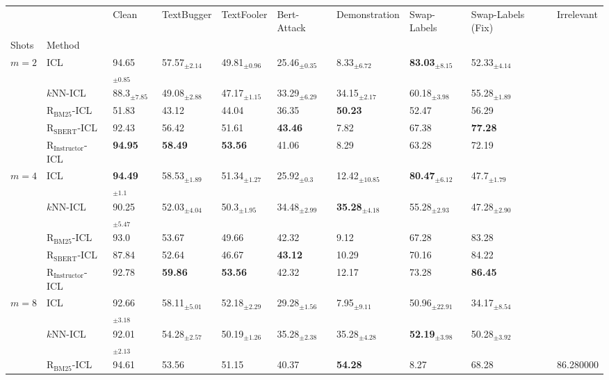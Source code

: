 \begin{tabular}{llllllllll}
\toprule
 &  & Clean & TextBugger & TextFooler & Bert-Attack & Demonstration & Swap-Labels & Swap-Labels (Fix) & Irrelevant  \\
Shots & Method &  &  &  &  &  &  &  &  \\
\midrule
\multirow[t]{5}{*}{$m=2$} & ICL & 94.65$_{\pm0.85}$ & 57.57$_{\pm2.14}$ & 49.81$_{\pm0.96}$ & 25.46$_{\pm0.35}$ & 8.33$_{\pm6.72}$ & \textbf{83.03$_{\pm8.15}$} & 52.33$_{\pm4.14}$ &  \\
 & $k$NN-ICL & 88.3$_{\pm7.85}$ & 49.08$_{\pm2.88}$ & 47.17$_{\pm1.15}$ & 33.29$_{\pm6.29}$ & 34.15$_{\pm2.17}$ & 60.18$_{\pm3.98}$ & 55.28$_{\pm1.89}$ &  \\
 & $\text{R}_{\text{BM25}}$-ICL & 51.83 & 43.12 & 44.04 & 36.35 & \textbf{50.23} & 52.47 & 56.29 &  \\
 & $\text{R}_{\text{SBERT}}$-ICL & 92.43 & 56.42 & 51.61 & \textbf{43.46} & 7.82 & 67.38 & \textbf{77.28} &  \\
 & $\text{R}_{\text{Instructor}}$-ICL & \textbf{94.95} & \textbf{58.49} & \textbf{53.56} & 41.06 & 8.29 & 63.28 & 72.19 &  \\
\cline{1-10}
\multirow[t]{5}{*}{$m=4$} & ICL & \textbf{94.49$_{\pm1.1}$} & 58.53$_{\pm1.89}$ & 51.34$_{\pm1.27}$ & 25.92$_{\pm0.3}$ & 12.42$_{\pm10.85}$ & \textbf{80.47$_{\pm6.12}$} & 47.7$_{\pm1.79}$ &  \\
 & $k$NN-ICL & 90.25$_{\pm5.47}$ & 52.03$_{\pm4.04}$ & 50.3$_{\pm1.95}$ & 34.48$_{\pm2.99}$ & \textbf{35.28$_{\pm4.18}$} & 55.28$_{\pm2.93}$ & 47.28$_{\pm2.90}$ &  \\
 & $\text{R}_{\text{BM25}}$-ICL & 93.0 & 53.67 & 49.66 & 42.32 & 9.12 & 67.28 & 83.28 &  \\
 & $\text{R}_{\text{SBERT}}$-ICL & 87.84 & 52.64 & 46.67 & \textbf{43.12} & 10.29 & 70.16 & 84.22 &  \\
 & $\text{R}_{\text{Instructor}}$-ICL & 92.78 & \textbf{59.86} & \textbf{53.56} & 42.32 & 12.17 & 73.28 & \textbf{86.45} &  \\
\cline{1-10}
\multirow[t]{5}{*}{$m=8$} & ICL & 92.66$_{\pm3.18}$ & 58.11$_{\pm5.01}$ & 52.18$_{\pm2.29}$ & 29.28$_{\pm1.56}$ & 7.95$_{\pm9.11}$ & 50.96$_{\pm22.91}$ & 34.17$_{\pm8.54}$ &  \\
 & $k$NN-ICL & 92.01$_{\pm2.13}$ & 54.28$_{\pm2.57}$ & 50.19$_{\pm1.26}$ & 35.28$_{\pm2.38}$ & 35.28$_{\pm4.28}$ & \textbf{52.19$_{\pm3.98}$} & 50.28$_{\pm3.92}$ &  \\
 & $\text{R}_{\text{BM25}}$-ICL & 94.61 & 53.56 & 51.15 & 40.37 & \textbf{54.28} & 8.27 & 68.28 & 86.280000 \\

\end{tabular}
